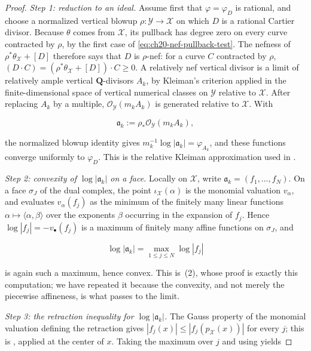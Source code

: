 \begin{proof}
\emph{Step 1: reduction to an ideal.}  Assume first that
$\varphi=\varphi_D$ is rational, and choose a normalized
vertical blowup
$\rho:\mathcal Y\to\mathcal X$ on which $D$ is a rational Cartier
divisor.  Because
$\theta$ comes from $\mathcal X$, its pullback has degree zero on every
curve contracted by $\rho$, by the first case of
\eqref{eq:ch20-nef-pullback-test}.  The nefness of
$\rho^*\theta_{\mathcal X}+[D]$ therefore says that $D$ is
$\rho$-nef: for a curve $C$ contracted by $\rho$,
$(D\cdot C)=(\rho^*\theta_{\mathcal X}+[D])\cdot C\geq0$.  A relatively
nef vertical divisor is a limit of relatively
ample vertical $\mathbf Q$-divisors $A_k$, by Kleiman's criterion
applied in the finite-dimensional space of vertical numerical classes on
$\mathcal Y$ relative to $\mathcal X$.  After
replacing $A_k$ by a
multiple, $\mathcal O_{\mathcal Y}(m_kA_k)$ is generated relative to
$\mathcal X$.  With

\[
       \mathfrak a_k:=\rho_*
          \mathcal O_{\mathcal Y}(m_kA_k),
\]

the normalized blowup identity gives
$m_k^{-1}\log|\mathfrak a_k|=\varphi_{A_k}$, and these functions converge
uniformly to $\varphi_D$.  This is the relative Kleiman approximation used
in \cite[\S5.2]{BFJ16}.

\emph{Step 2: convexity of $\log|\mathfrak a_k|$ on a face.}  Locally on
$\mathcal X$, write $\mathfrak a_k=(f_1,\ldots,f_N)$.  On a face
$\sigma_J$ of the dual complex, the point $\iota_{\mathcal X}(\alpha)$
is the monomial valuation $v_\alpha$, and
 evaluates $v_\alpha(f_j)$ as the minimum of the
finitely many linear functions $\alpha\mapsto\langle\alpha,\beta\rangle$
over the exponents $\beta$ occurring in the expansion of $f_j$.  Hence
$\log|f_j|=-v_\bullet(f_j)$ is a maximum of finitely many affine
functions on $\sigma_J$, and

\[
       \log|\mathfrak a_k|
       =\max_{1\leq j\leq N}\log|f_j|
\]

is again such a maximum, hence convex.  This is
\,(2), whose proof is exactly this
computation; we have repeated it because the convexity, and not merely the
piecewise affineness, is what passes to the limit.

\emph{Step 3: the retraction inequality for $\log|\mathfrak a_k|$.}  The
Gauss property of the monomial valuation defining the retraction gives
$|f_j(x)|\leq|f_j(p_{\mathcal X}(x))|$ for every $j$; this is
, applied at the center of $x$.  Taking the
maximum over $j$ and using
 yields


\end{proof}
